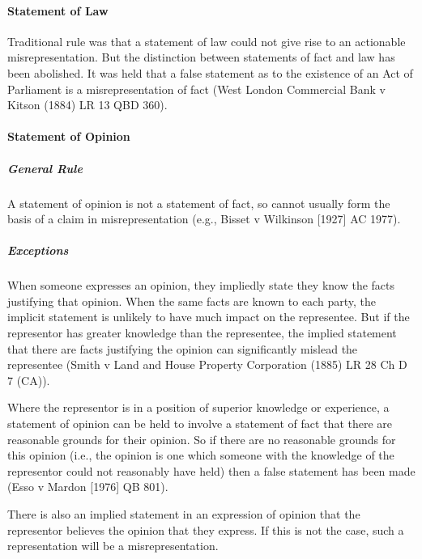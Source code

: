 \documentclass[
]{article}
\begin{document}
\hypertarget{statement-of-law}{%
\paragraph{Statement of Law}\label{statement-of-law}}

Traditional rule was that a statement of law could not give rise to an
actionable misrepresentation. But the distinction between statements of
fact and law has been abolished. It was held that a false statement as
to the existence of an Act of Parliament is a misrepresentation of fact
(West London Commercial Bank v Kitson (1884) LR 13 QBD 360).

\hypertarget{statement-of-opinion}{%
\paragraph{Statement of Opinion}\label{statement-of-opinion}}

\hypertarget{general-rule}{%
\subparagraph{General Rule}\label{general-rule}}

A statement of opinion is not a statement of fact, so cannot usually
form the basis of a claim in misrepresentation (e.g., Bisset v Wilkinson
{[}1927{]} AC 1977).

\hypertarget{exceptions}{%
\subparagraph{Exceptions}\label{exceptions}}

When someone expresses an opinion, they impliedly state they know the
facts justifying that opinion. When the same facts are known to each
party, the implicit statement is unlikely to have much impact on the
representee. But if the representor has greater knowledge than the
representee, the implied statement that there are facts justifying the
opinion can significantly mislead the representee (Smith v Land and
House Property Corporation (1885) LR 28 Ch D 7 (CA)).

Where the representor is in a position of superior knowledge or
experience, a statement of opinion can be held to involve a statement of
fact that there are reasonable grounds for their opinion. So if there
are no reasonable grounds for this opinion (i.e., the opinion is one
which someone with the knowledge of the representor could not reasonably
have held) then a false statement has been made (Esso v Mardon
{[}1976{]} QB 801).

There is also an implied statement in an expression of opinion that the
representor believes the opinion that they express. If this is not the
case, such a representation will be a misrepresentation.
\end{document}
